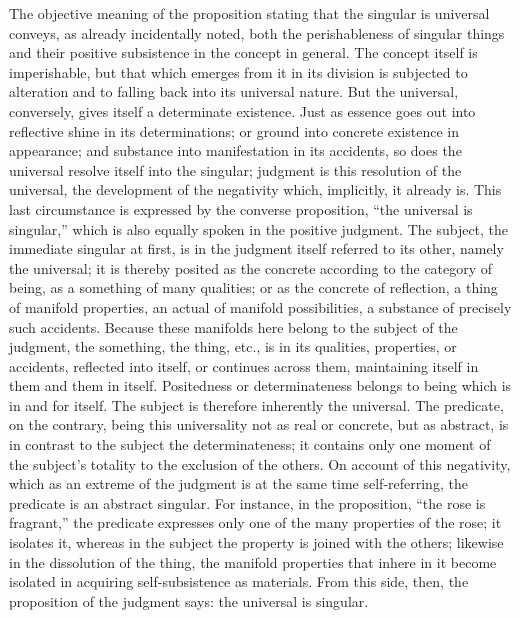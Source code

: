 The objective meaning of the proposition stating
that the singular is universal conveys,
as already incidentally noted,
both the perishableness of singular things
and their positive subsistence in the concept in general.
The concept itself is imperishable,
but that which emerges from it in its division
is subjected to alteration
and to falling back into its universal nature.
But the universal, conversely,
gives itself a determinate existence.
Just as essence goes out into
reflective shine in its determinations;
or ground into concrete existence in appearance;
and substance into manifestation in its accidents,
so does the universal resolve itself into the singular;
judgment is this resolution of the universal,
the development of the negativity
which, implicitly, it already is.
This last circumstance is expressed
by the converse proposition,
“the universal is singular,”
which is also equally spoken in the positive judgment.
The subject, the immediate singular at first,
is in the judgment itself referred to its other,
namely the universal;
it is thereby posited as the concrete
according to the category of being,
as a something of many qualities;
or as the concrete of reflection,
a thing of manifold properties,
an actual of manifold possibilities,
a substance of precisely such accidents.
Because these manifolds here belong
to the subject of the judgment, the something, the thing, etc.,
is in its qualities, properties, or accidents,
reflected into itself, or continues across them,
maintaining itself in them and them in itself.
Positedness or determinateness belongs to being
which is in and for itself.
The subject is therefore inherently the universal.
The predicate, on the contrary,
being this universality not as real or concrete,
but as abstract,
is in contrast to the subject the determinateness;
it contains only one moment of the subject's totality
to the exclusion of the others.
On account of this negativity,
which as an extreme of the judgment is at the
same time self-referring,
the predicate is an abstract singular.
For instance, in the proposition,
“the rose is fragrant,”
the predicate expresses only one of
the many properties of the rose;
it isolates it, whereas in the subject
the property is joined with the others;
likewise in the dissolution of the thing,
the manifold properties that inhere in it become
isolated in acquiring self-subsistence as materials.
From this side, then, the proposition of the judgment says:
the universal is singular.

